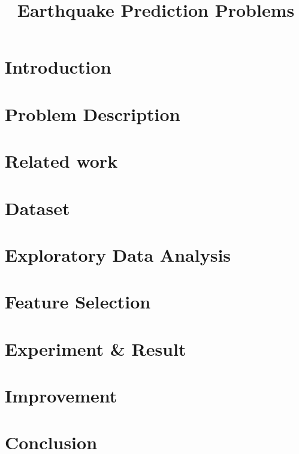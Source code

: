 \documentclass[12pt,oneside,letterpaper,english]{article}
\title{Earthquake Prediction Problems} %
\begin{document}


\newpage
\doublespacing
\renewcommand{\baselinestretch}{1}\normalsize
\tableofcontents
\renewcommand{\baselinestretch}{1}\normalsize
\thispagestyle{fancy} %

\newpage
{} 
\newpage
\section{Introduction} 

\section{Problem Description}

\section{Related work}

\section{Dataset}

\section{Exploratory Data Analysis}

\section{Feature Selection}

\section{Experiment \& Result}

\section{Improvement}

\section{Conclusion}


\newpage
\nocite{*}



\label{endOfDoc}
\end{document}
